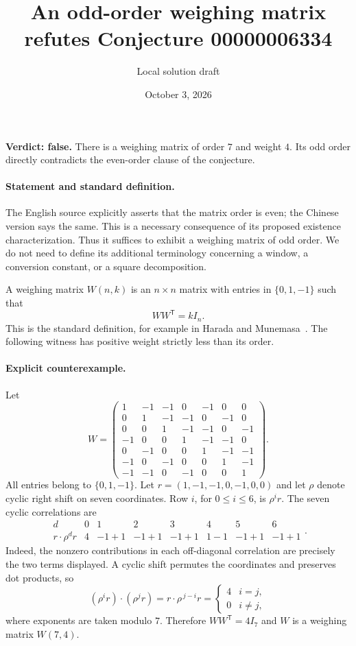 \documentclass[10pt]{article}
\title{An odd-order weighing matrix refutes Conjecture 00000006334}
\author{Local solution draft}
\date{October 3, 2026}
\makeatletter
\renewcommand{\maketitle}{\begin{center}
{\Large\bfseries\@title\par}\vspace{0.6em}
{\small\@author\par\@date}
\end{center}\vspace{0.5em}}
\makeatother
\begin{document}
\maketitle

\noindent\textbf{Verdict: false.} There is a weighing matrix of order $7$ and weight $4$. Its odd order directly contradicts the even-order clause of the conjecture.

\paragraph{Statement and standard definition.}
The English source explicitly asserts that the matrix order is even; the Chinese version says the same. This is a necessary consequence of its proposed existence characterization. Thus it suffices to exhibit a weighing matrix of odd order. We do not need to define its additional terminology concerning a window, a conversion constant, or a square decomposition.

A weighing matrix $W(n,k)$ is an $n\times n$ matrix with entries in $\{0,1,-1\}$ such that
\[
WW^{\mathsf T}=kI_n.
\]
This is the standard definition, for example in Harada and Munemasa~\cite{HM}. The following witness has positive weight strictly less than its order.

\paragraph{Explicit counterexample.}
Let
\[
W=\begin{pmatrix}
 1&-1&-1& 0&-1& 0& 0\\
 0& 1&-1&-1& 0&-1& 0\\
 0& 0& 1&-1&-1& 0&-1\\
-1& 0& 0& 1&-1&-1& 0\\
 0&-1& 0& 0& 1&-1&-1\\
-1& 0&-1& 0& 0& 1&-1\\
-1&-1& 0&-1& 0& 0& 1
\end{pmatrix}.
\]
All entries belong to $\{0,1,-1\}$. Let $r=(1,-1,-1,0,-1,0,0)$ and let $\rho$ denote cyclic right shift on seven coordinates. Row $i$, for $0\le i\le6$, is $\rho^i r$. The seven cyclic correlations are
\[
\begin{array}{c|rrrrrrr}
d&0&1&2&3&4&5&6\\ \hline
r\cdot\rho^d r&4&-1+1&-1+1&-1+1&1-1&-1+1&-1+1
\end{array}.
\]
Indeed, the nonzero contributions in each off-diagonal correlation are precisely the two terms displayed. A cyclic shift permutes the coordinates and preserves dot products, so
\[
(\rho^i r)\cdot(\rho^j r)=r\cdot\rho^{\,j-i}r
 =\begin{cases}4&i=j,\\0&i\ne j,\end{cases}
\]
where exponents are taken modulo $7$. Therefore $WW^{\mathsf T}=4I_7$ and $W$ is a weighing matrix $W(7,4)$.
\end{document}

